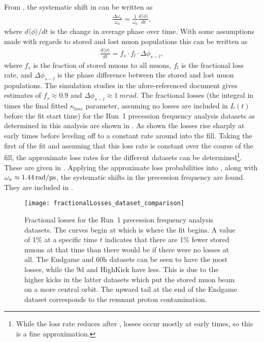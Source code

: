 From , the systematic shift in \wa can be written as
    \begin{align}
        \frac{\Delta\omega_{a}}{\omega_{a}} = \frac{1}{\omega_{a}}\frac{d\langle\phi\rangle}{dt},
    \end{align}
where $d\langle\phi\rangle/dt$ is the change in average phase over time. With some assumptions made with regards to stored and lost muon populations this can be written as \cite{MikeLosses}
    \begin{align} \label{eq:phaseChangeLostMuons}
        \frac{d\langle\phi\rangle}{dt} = f_{s} \cdot f_{l} \cdot \Delta\phi_{s-l},
    \end{align}
where $f_{s}$ is the fraction of stored muons to all muons, $f_{l}$ is the fractional loss rate, and $\Delta\phi_{s-l}$ is the phase difference between the stored and lost muon populations. The simulation studies in the afore-referenced document gives estimates of $f_{s} \approx 0.9$ and $\Delta\phi_{s-l} \approx \SI{1}{mrad}$. The fractional losses (the integral in  times the final fitted $\kappa_{loss}$ parameter, assuming no losses are included in $L(t)$ before the fit start time) for the Run~1 precession frequency analysis datasets as determined in this analysis are shown in . As shown the losses rise sharply at early times before leveling off to a constant rate around  into the fill. Taking the first  of the fit and assuming that this loss rate is constant over the course of the fill, the approximate loss rates for the different datasets can be determined\footnote{While the loss rate reduces after , losses occur mostly at early times, so this is a fine approximation.}. These are given in . Applying the approximate loss probabilities into , along with $\omega_{a} \approx \SI{1.44}{rad}/\SI{}{\micro s}$, the systematic shifts in the precession frequency are found. They are included in .



\begin{figure}
    \centering
    \texttt{[image: fractionalLosses\_dataset\_comparison]}
    \caption[Fractional muon losses in the analyzed Run~1 datasets]{Fractional losses for the Run~1 precession frequency analysis datasets. The curves begin at  which is where the fit begins. A value of 1\% at a specific time $t$ indicates that there are 1\% fewer stored muons at that time than there would be if there were no losses at all. The Endgame and 60h datasets can be seen to have the most losses, while the 9d and HighKick have less. This is due to the higher kicks in the latter datasets which put the stored muon beam on a more central orbit. The upward tail at the end of the Endgame dataset corresponds to the remnant proton contamination.}
    \label{fig:fractionallosses}
\end{figure}



